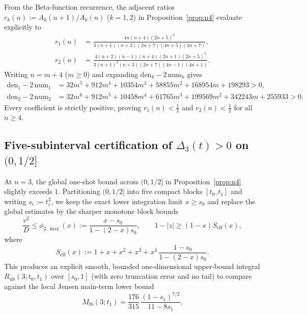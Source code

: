 \documentclass[11pt,a4paper]{article}
\theoremstyle{remark}
\numberwithin{equation}{section}
\begin{document}
From the Beta-function recurrence, the adjacent ratios $r_k(n) := A_k(n+1)/A_k(n)$ ($k = 1, 2$) in Proposition~\ref{prop:n4} evaluate explicitly to
\begin{align*}
    r_1(n) &= \frac{4n(n + 4)(2n + 5)^3}{3(n + 1)(n + 3)(2n + 7)(4n + 5)(4n + 7)},\\
    r_2(n) &= \frac{4(n + 2)(n - 1)(n + 4)(2n + 1)(2n + 5)^2}{3(n + 1)^2(n + 3)(2n + 7)(4n - 1)(4n + 1)}.
\end{align*}
Writing $n = m + 4$ ($m \ge 0$) and expanding $\mathrm{den}_k - 2\,\mathrm{num}_k$ gives
\begin{align*}
    \mathrm{den}_1 - 2\,\mathrm{num}_1
    &= 32m^5 + 912m^4 + 10354m^3 + 58855m^2 + 168954m + 198293 > 0,\\
    \mathrm{den}_2 - 2\,\mathrm{num}_2
    &= 32m^6 + 912m^5 + 10458m^4 + 61765m^3 + 199569m^2 + 342243m + 255933 > 0.
\end{align*}
Every coefficient is strictly positive, proving $r_1(n) < \frac12$ and $r_2(n) < \frac12$ for all $n \ge 4$.

\subsection{Five-subinterval certification of \texorpdfstring{$\Delta_3(t) > 0$}{Delta\_3(t) > 0} on \texorpdfstring{$(0, 1/2]$}{(0, 1/2]}}
\label{app:n3}

At $n = 3$, the global one-shot bound across $(0, 1/2]$ in Proposition~\ref{prop:n4} slightly exceeds $1$. Partitioning $(0, 1/2]$ into five compact blocks $[t_0, t_1]$ and writing $s_i := t_i^2$, we keep the exact lower integration limit $x \ge s_0$ and replace the global estimates by the sharper monotone block bounds
\[
    \frac{v^2}{D} \le \phi_{2,\max}(x) := \frac{x - s_0}{1 - (2 - x)s_0},
    \qquad
    1 - |z| \ge (1 - x)S_{\mathrm{eff}}(x),
\]
where
\[
    S_{\mathrm{eff}}(x) := 1 + x + x^2 + x^3 + x^4\,\frac{1 - s_0}{1 - (2 - x)s_0}.
\]
This produces an explicit smooth, bounded one-dimensional upper-bound integral $R_{\mathrm{ub}}(3; t_0, t_1)$ over $[s_0, 1]$ (with zero truncation error and no tail) to compare against the local Jensen main-term lower bound
\[
    M_{\mathrm{lb}}(3; t_1) = \frac{176}{315}\,\frac{(1 - s_1)^{7/2}}{11 - 8s_1}.
\]
\end{document}
